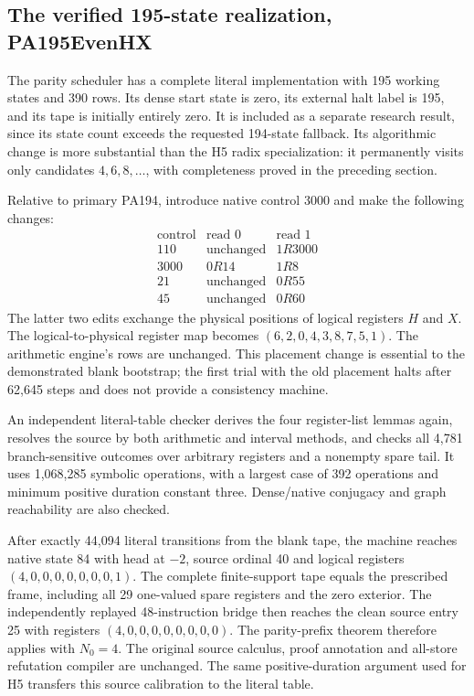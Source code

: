 \subsection{The verified 195-state realization, PA195EvenHX}

The parity scheduler has a complete literal implementation with 195
working states and 390 rows. Its dense start state is zero, its external
halt label is 195, and its tape is initially entirely zero. It is included
as a separate research result, since its state count exceeds the requested
194-state fallback. Its algorithmic change is more substantial than the
H5 radix specialization: it permanently visits only candidates
$4,6,8,\ldots$, with completeness proved in the preceding section.

Relative to primary PA194, introduce native control 3000 and make the
following changes:
\[
\begin{array}{c|cc}
\text{control}&\text{read 0}&\text{read 1}\\\hline
110&\text{unchanged}&1R3000\\
3000&0R14&1R8\\
21&\text{unchanged}&0R55\\
45&\text{unchanged}&0R60
\end{array}
\]
The latter two edits exchange the physical positions of logical registers
$H$ and $X$. The logical-to-physical register map becomes
$(6,2,0,4,3,8,7,5,1)$. The arithmetic engine's rows are unchanged.
This placement change is essential to the demonstrated blank bootstrap;
the first trial with the old placement halts after 62,645 steps and does
not provide a consistency machine.

An independent literal-table checker derives the four register-list
lemmas again, resolves the source by both arithmetic and interval methods,
and checks all 4,781 branch-sensitive outcomes over arbitrary registers
and a nonempty spare tail. It uses 1,068,285 symbolic operations, with a
largest case of 392 operations and minimum positive duration constant
three. Dense/native conjugacy and graph reachability are also checked.

After exactly 44,094 literal transitions from the blank tape, the machine
reaches native state 84 with head at $-2$, source ordinal 40 and logical
registers $(4,0,0,0,0,0,0,0,1)$. The complete finite-support tape equals
the prescribed frame, including all 29 one-valued spare registers and
the zero exterior. The independently replayed 48-instruction bridge
then reaches the clean source entry 25 with registers
$(4,0,0,0,0,0,0,0,0)$. The parity-prefix theorem therefore applies with
$N_0=4$. The original source calculus, proof annotation and all-store
refutation compiler are unchanged. The same positive-duration argument
used for H5 transfers this source calibration to the literal table.

